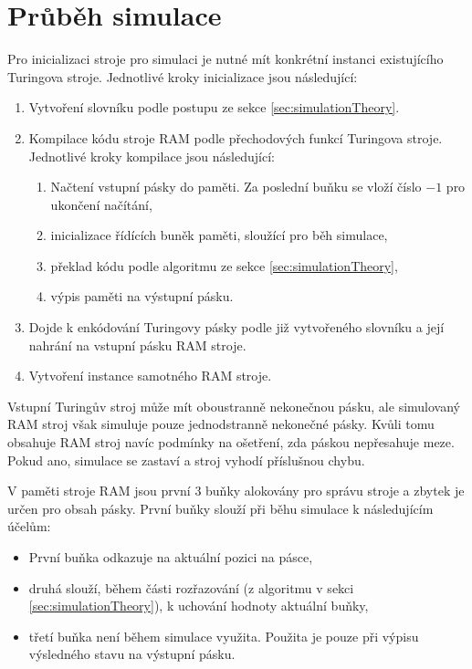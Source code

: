 \section{Průběh simulace}
Pro inicializaci stroje pro simulaci je nutné mít konkrétní instanci existujícího Turingova stroje.
Jednotlivé kroky inicializace jsou následující:
\begin{enumerate}
	\item Vytvoření slovníku podle postupu ze sekce \ref{sec:simulationTheory}.
	\item Kompilace kódu stroje RAM podle přechodových funkcí Turingova stroje. Jednotlivé kroky kompilace jsou následující:
	\begin{enumerate}
		\item Načtení vstupní pásky do paměti. Za poslední buňku se vloží číslo $-1$ pro ukončení načítání,
		\item inicializace řídících buněk paměti, sloužící pro běh simulace,
		\item překlad kódu podle algoritmu ze sekce \ref{sec:simulationTheory},
		\item výpis paměti na výstupní pásku.
	\end{enumerate}
	\item Dojde k enkódování Turingovy pásky podle již vytvořeného slovníku a její nahrání na vstupní pásku RAM stroje.
	\item Vytvoření instance samotného RAM stroje.
\end{enumerate}

Vstupní Turingův stroj může mít oboustranně nekonečnou pásku, ale simulovaný RAM stroj však simuluje pouze jednodstranně nekonečné pásky.
Kvůli tomu obsahuje RAM stroj navíc podmínky na ošetření, zda páskou nepřesahuje meze. 
Pokud ano, simulace se zastaví a stroj vyhodí příslušnou chybu. 

V paměti stroje RAM jsou první 3 buňky alokovány pro správu stroje a zbytek je určen pro obsah pásky. První buňky slouží při běhu simulace k následujícím účelům:
\begin{itemize}
	\item První buňka odkazuje na aktuální pozici na pásce,
	\item druhá slouží, během části rozřazování (z algoritmu v sekci \ref{sec:simulationTheory}), k uchování hodnoty aktuální buňky,
	\item třetí buňka není během simulace využita. Použita je pouze při výpisu výsledného stavu na výstupní pásku.
\end{itemize}

